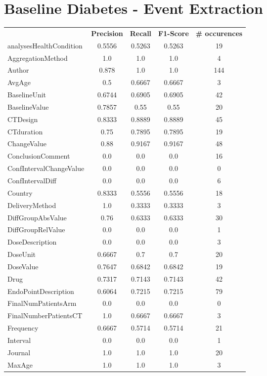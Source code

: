 \section{Baseline Diabetes - Event Extraction}
\begin{longtable}{ l c c c c}
 & \textbf{Precision} & \textbf{Recall} & \textbf{F1-Score} & \textbf{\# occurences} \\ \cline{1-5}
analysesHealthCondition & 0.5556 & 0.5263 & 0.5263 & 19\\
AggregationMethod & 1.0 & 1.0 & 1.0 & 4\\
Author & 0.878 & 1.0 & 1.0 & 144\\
AvgAge & 0.5 & 0.6667 & 0.6667 & 3\\
BaselineUnit & 0.6744 & 0.6905 & 0.6905 & 42\\
BaselineValue & 0.7857 & 0.55 & 0.55 & 20\\
CTDesign & 0.8333 & 0.8889 & 0.8889 & 45\\
CTduration & 0.75 & 0.7895 & 0.7895 & 19\\
ChangeValue & 0.88 & 0.9167 & 0.9167 & 48\\
ConclusionComment & 0.0 & 0.0 & 0.0 & 16\\
ConfIntervalChangeValue & 0.0 & 0.0 & 0.0 & 0\\
ConfIntervalDiff & 0.0 & 0.0 & 0.0 & 6\\
Country & 0.8333 & 0.5556 & 0.5556 & 18\\
DeliveryMethod & 1.0 & 0.3333 & 0.3333 & 3\\
DiffGroupAbsValue & 0.76 & 0.6333 & 0.6333 & 30\\
DiffGroupRelValue & 0.0 & 0.0 & 0.0 & 1\\
DoseDescription & 0.0 & 0.0 & 0.0 & 3\\
DoseUnit & 0.6667 & 0.7 & 0.7 & 20\\
DoseValue & 0.7647 & 0.6842 & 0.6842 & 19\\
Drug & 0.7317 & 0.7143 & 0.7143 & 42\\
EndoPointDescription & 0.6064 & 0.7215 & 0.7215 & 79\\
FinalNumPatientsArm & 0.0 & 0.0 & 0.0 & 0\\
FinalNumberPatientsCT & 1.0 & 0.6667 & 0.6667 & 3\\
Frequency & 0.6667 & 0.5714 & 0.5714 & 21\\
Interval & 0.0 & 0.0 & 0.0 & 1\\
Journal & 1.0 & 1.0 & 1.0 & 20\\
MaxAge & 1.0 & 1.0 & 1.0 & 3\\

\end{longtable}
